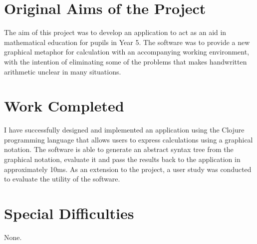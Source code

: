 \documentclass[12pt,twoside,notitlepage,xetex]{report}
\begin{document}
\section*{Original Aims of the Project}

The aim of this project was to develop an application to act as an aid in mathematical education for pupils in Year 5.  The software was to provide a new graphical metaphor for calculation with an accompanying working environment, with the intention of eliminating some of the problems that makes handwritten arithmetic unclear in many situations.


\section*{Work Completed}

I have successfully designed and implemented an application using the Clojure programming language that allows users to express calculations using a graphical notation.  The software is able to generate an abstract syntax tree from the graphical notation, evaluate it and pass the results back to the application in approximately 10ms.  As an extension to the project, a user study was conducted to evaluate the utility of the software.


\section*{Special Difficulties}

None.
\end{document}

